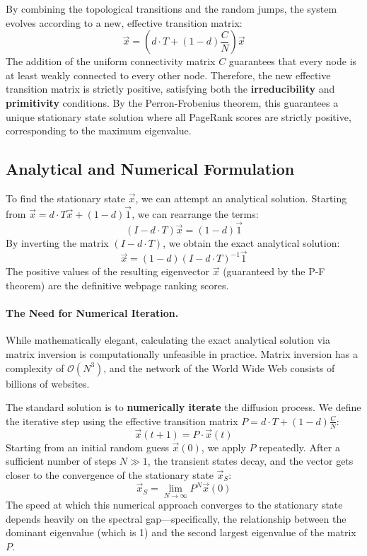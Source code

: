 By combining the topological transitions and the random jumps, the system evolves according to a new, effective transition matrix:
\[
    \vec{x} = \left( d \cdot T + (1 - d)\frac{C}{N} \right) \vec{x}
\]
The addition of the uniform connectivity matrix $C$ guarantees that every node is at least weakly connected to every other node. Therefore, the new effective transition matrix is strictly positive, satisfying both the \textbf{irreducibility} and \textbf{primitivity} conditions. By the Perron-Frobenius theorem, this guarantees a unique stationary state solution where all PageRank scores are strictly positive, corresponding to the maximum eigenvalue.

\subsection{Analytical and Numerical Formulation}

To find the stationary state $\vec{x}$, we can attempt an analytical solution. Starting from $\vec{x} = d \cdot T\vec{x} + (1 - d)\vec{1}$, we can rearrange the terms:
\[
    (I - d \cdot T)\vec{x} = (1 - d)\vec{1}
\]
By inverting the matrix $(I - d \cdot T)$, we obtain the exact analytical solution:
\[
    \vec{x} = (1 - d)(I - d \cdot T)^{-1}\vec{1}
\]
The positive values of the resulting eigenvector $\vec{x}$ (guaranteed by the P-F theorem) are the definitive webpage ranking scores.

\paragraph{The Need for Numerical Iteration.}
While mathematically elegant, calculating the exact analytical solution via matrix inversion is computationally unfeasible in practice. Matrix inversion has a complexity of $\mathcal{O}(N^3)$, and the network of the World Wide Web consists of billions of websites.

The standard solution is to \textbf{numerically iterate} the diffusion process. We define the iterative step using the effective transition matrix $P = d \cdot T + (1 - d)\frac{C}{N}$:
\[
    \vec{x}(t+1) = P \cdot \vec{x}(t)
\]
Starting from an initial random guess $\vec{x}(0)$, we apply $P$ repeatedly. After a sufficient number of steps $N \gg 1$, the transient states decay, and the vector gets closer to the convergence of the stationary state $\vec{x}_S$:
\[
    \vec{x}_S = \lim_{N \to \infty} P^N \vec{x}(0)
\]
The speed at which this numerical approach converges to the stationary state depends heavily on the spectral gap—specifically, the relationship between the dominant eigenvalue (which is 1) and the second largest eigenvalue of the matrix $P$.

